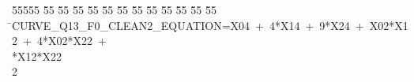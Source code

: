 %
%
\begin{tabbing}
55555 \= 55 \= 55 \= 55 \= 55 \= 55 \= 55 \= 55 \= 55 \= 55 \= 55 \= 55 \= 55 \= \>CURVE\_Q13\_F0\_CLEAN2\_EQUATION=X04\ +\ 4*X14\ +\ 9*X24\ +\ X02*X12\ +\ 4*X02*X22\ +\ \\[0pt]
*X12*X22\\[0pt]
2\>\end{tabbing}
